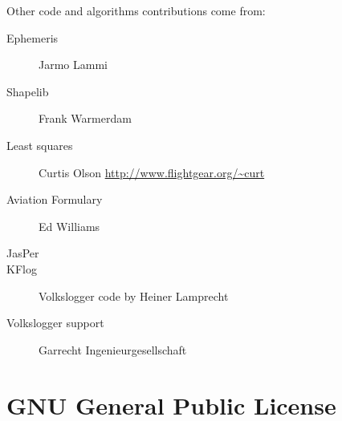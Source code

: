 \documentclass[a4paper,12pt]{refrep}
\begin{document}
Other code and algorithms contributions come from:
\begin{description}
\item[Ephemeris] Jarmo Lammi
\item[Shapelib] Frank Warmerdam
\item[Least squares] Curtis Olson \url{http://www.flightgear.org/~curt}
\item[Aviation Formulary] Ed Williams
\item[JasPer] 
\item[KFlog] Volkslogger code by Heiner Lamprecht
\item[Volkslogger support] Garrecht Ingenieurgesellschaft
\end{description}

%
%
%
%

\appendix
\chapter{GNU General Public License}\label{cha:gnu-general-public}

%
%
\end{document}
